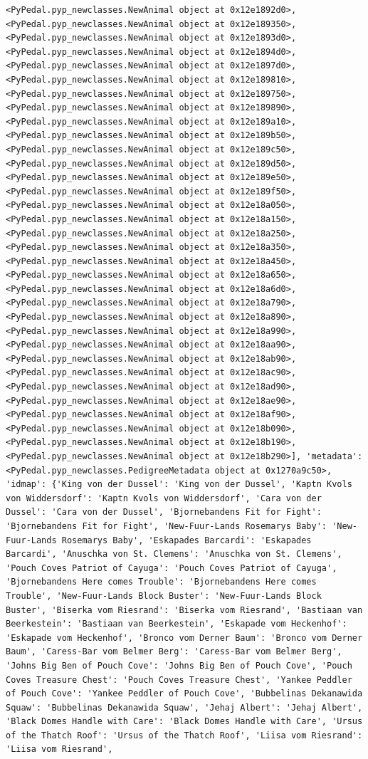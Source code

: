 \documentclass[
  letterpaper,
  DIV=11,
  numbers=noendperiod]{scrreprt}
\begin{document}
\begin{codelisting}
{\begin{verbatim}
<PyPedal.pyp_newclasses.NewAnimal object at 0x12e1892d0>, <PyPedal.pyp_newclasses.NewAnimal object at 0x12e189350>, <PyPedal.pyp_newclasses.NewAnimal object at 0x12e1893d0>, <PyPedal.pyp_newclasses.NewAnimal object at 0x12e1894d0>, <PyPedal.pyp_newclasses.NewAnimal object at 0x12e1897d0>, <PyPedal.pyp_newclasses.NewAnimal object at 0x12e189810>, <PyPedal.pyp_newclasses.NewAnimal object at 0x12e189750>, <PyPedal.pyp_newclasses.NewAnimal object at 0x12e189890>, <PyPedal.pyp_newclasses.NewAnimal object at 0x12e189a10>, <PyPedal.pyp_newclasses.NewAnimal object at 0x12e189b50>, <PyPedal.pyp_newclasses.NewAnimal object at 0x12e189c50>, <PyPedal.pyp_newclasses.NewAnimal object at 0x12e189d50>, <PyPedal.pyp_newclasses.NewAnimal object at 0x12e189e50>, <PyPedal.pyp_newclasses.NewAnimal object at 0x12e189f50>, <PyPedal.pyp_newclasses.NewAnimal object at 0x12e18a050>, <PyPedal.pyp_newclasses.NewAnimal object at 0x12e18a150>, <PyPedal.pyp_newclasses.NewAnimal object at 0x12e18a250>, <PyPedal.pyp_newclasses.NewAnimal object at 0x12e18a350>, <PyPedal.pyp_newclasses.NewAnimal object at 0x12e18a450>, <PyPedal.pyp_newclasses.NewAnimal object at 0x12e18a650>, <PyPedal.pyp_newclasses.NewAnimal object at 0x12e18a6d0>, <PyPedal.pyp_newclasses.NewAnimal object at 0x12e18a790>, <PyPedal.pyp_newclasses.NewAnimal object at 0x12e18a890>, <PyPedal.pyp_newclasses.NewAnimal object at 0x12e18a990>, <PyPedal.pyp_newclasses.NewAnimal object at 0x12e18aa90>, <PyPedal.pyp_newclasses.NewAnimal object at 0x12e18ab90>, <PyPedal.pyp_newclasses.NewAnimal object at 0x12e18ac90>, <PyPedal.pyp_newclasses.NewAnimal object at 0x12e18ad90>, <PyPedal.pyp_newclasses.NewAnimal object at 0x12e18ae90>, <PyPedal.pyp_newclasses.NewAnimal object at 0x12e18af90>, <PyPedal.pyp_newclasses.NewAnimal object at 0x12e18b090>, <PyPedal.pyp_newclasses.NewAnimal object at 0x12e18b190>, <PyPedal.pyp_newclasses.NewAnimal object at 0x12e18b290>], 'metadata': <PyPedal.pyp_newclasses.PedigreeMetadata object at 0x1270a9c50>, 'idmap': {'King von der Dussel': 'King von der Dussel', 'Kaptn Kvols von Widdersdorf': 'Kaptn Kvols von Widdersdorf', 'Cara von der Dussel': 'Cara von der Dussel', 'Bjornebandens Fit for Fight': 'Bjornebandens Fit for Fight', 'New-Fuur-Lands Rosemarys Baby': 'New-Fuur-Lands Rosemarys Baby', 'Eskapades Barcardi': 'Eskapades Barcardi', 'Anuschka von St. Clemens': 'Anuschka von St. Clemens', 'Pouch Coves Patriot of Cayuga': 'Pouch Coves Patriot of Cayuga', 'Bjornebandens Here comes Trouble': 'Bjornebandens Here comes Trouble', 'New-Fuur-Lands Block Buster': 'New-Fuur-Lands Block Buster', 'Biserka vom Riesrand': 'Biserka vom Riesrand', 'Bastiaan van Beerkestein': 'Bastiaan van Beerkestein', 'Eskapade vom Heckenhof': 'Eskapade vom Heckenhof', 'Bronco vom Derner Baum': 'Bronco vom Derner Baum', 'Caress-Bar vom Belmer Berg': 'Caress-Bar vom Belmer Berg', 'Johns Big Ben of Pouch Cove': 'Johns Big Ben of Pouch Cove', 'Pouch Coves Treasure Chest': 'Pouch Coves Treasure Chest', 'Yankee Peddler of Pouch Cove': 'Yankee Peddler of Pouch Cove', 'Bubbelinas Dekanawida Squaw': 'Bubbelinas Dekanawida Squaw', 'Jehaj Albert': 'Jehaj Albert', 'Black Domes Handle with Care': 'Black Domes Handle with Care', 'Ursus of the Thatch Roof': 'Ursus of the Thatch Roof', 'Liisa vom Riesrand': 'Liisa vom Riesrand', 
\end{verbatim}}
\end{codelisting}
\end{document}

